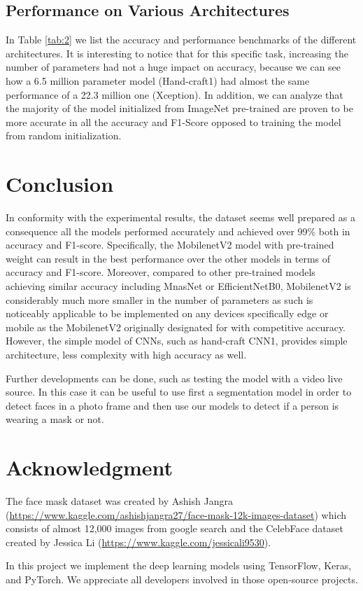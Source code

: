 \documentclass[conference]{IEEEtran}
\begin{document}
\subsection{Performance on Various Architectures}
In Table \ref{tab:2} we list the accuracy and performance benchmarks of the different architectures. It is interesting to notice that for this specific task, increasing the number of parameters had not a huge impact on accuracy, because we can see how a 6.5 million parameter model (Hand-craft1) had almost the same performance of a 22.3 million one (Xception). In addition, we can analyze that the majority of the model initialized from ImageNet pre-trained are proven to be more accurate in all the accuracy and F1-Score opposed to training the model from random initialization. 


\section{Conclusion}
In conformity with the experimental results, the dataset seems well prepared  as a consequence all the models performed accurately and achieved over 99\% both in accuracy and F1-score. Specifically, the MobilenetV2 model with pre-trained weight can result in the best performance over the other models in terms of accuracy and F1-score. Moreover, compared to other pre-trained models achieving similar accuracy including MnasNet or EfficientNetB0, MobilenetV2 is considerably much more smaller in the number of parameters as such is noticeably applicable to be implemented on any devices specifically edge or mobile as the MobilenetV2 originally designated for with competitive accuracy. However, the simple model of CNNs, such as hand-craft CNN1, provides simple architecture, less complexity with high accuracy as well.

Further developments can be done, such as testing the model with a video live source. In this case it can be useful to use first a segmentation model in order to detect faces in a photo frame and then use our models to detect if a person is wearing a mask or not. 

\section*{Acknowledgment}

The face mask dataset was created by Ashish Jangra (\url{https://www.kaggle.com/ashishjangra27/face-mask-12k-images-dataset}) which consists of almost 12,000 images from google search and the CelebFace dataset created by Jessica Li (\url{https://www.kaggle.com/jessicali9530}). 

In this project we implement the deep learning models using TensorFlow, Keras, and PyTorch. We appreciate all developers involved in those open-source projects. 



\printbibliography
\end{document}
